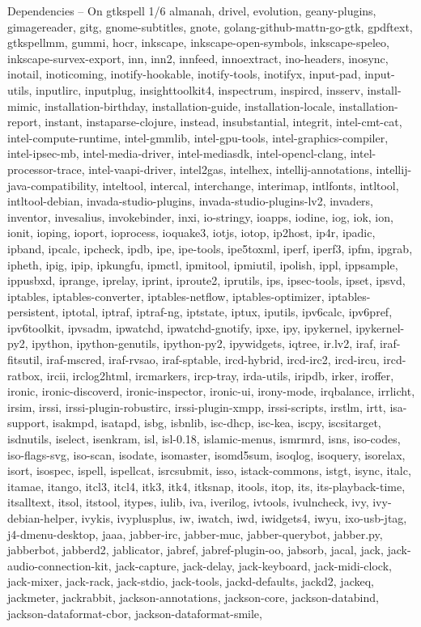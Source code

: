 \documentclass{beamer}
\begin{document}
\begin{frame}{Dependencies – On gtkspell 1/6}
\tiny almanah, drivel, evolution, geany-plugins, gimagereader, gitg, gnome-subtitles, gnote, golang-github-mattn-go-gtk, gpdftext, \alert{gtkspellmm}, gummi, hocr, inkscape, inkscape-open-symbols, inkscape-speleo, inkscape-survex-export, inn, inn2, innfeed, innoextract, ino-headers, inosync, inotail, inoticoming, inotify-hookable, inotify-tools, inotifyx, input-pad, input-utils, inputlirc, inputplug, insighttoolkit4, inspectrum, inspircd, insserv, install-mimic, installation-birthday, installation-guide, installation-locale, installation-report, instant, instaparse-clojure, instead, insubstantial, integrit, intel-cmt-cat, intel-compute-runtime, intel-gmmlib, intel-gpu-tools, intel-graphics-compiler, intel-ipsec-mb, intel-media-driver, intel-mediasdk, intel-opencl-clang, intel-processor-trace, intel-vaapi-driver, intel2gas, intelhex, intellij-annotations, intellij-java-compatibility, inteltool, intercal, interchange, interimap, intlfonts, intltool, intltool-debian, invada-studio-plugins, invada-studio-plugins-lv2, invaders, inventor, invesalius, invokebinder, inxi, io-stringy, ioapps, iodine, iog, iok, ion, ionit, ioping, ioport, ioprocess, ioquake3, iotjs, iotop, ip2host, ip4r, ipadic, ipband, ipcalc, ipcheck, ipdb, ipe, ipe-tools, ipe5toxml, iperf, iperf3, ipfm, ipgrab, ipheth, ipig, ipip, ipkungfu, ipmctl, ipmitool, ipmiutil, ipolish, ippl, ippsample, ippusbxd, iprange, iprelay, iprint, iproute2, iprutils, ips, ipsec-tools, ipset, ipsvd, iptables, iptables-converter, iptables-netflow, iptables-optimizer, iptables-persistent, iptotal, iptraf, iptraf-ng, iptstate, iptux, iputils, ipv6calc, ipv6pref, ipv6toolkit, ipvsadm, ipwatchd, ipwatchd-gnotify, ipxe, ipy, ipykernel, ipykernel-py2, ipython, ipython-genutils, ipython-py2, ipywidgets, iqtree, ir.lv2, iraf, iraf-fitsutil, iraf-mscred, iraf-rvsao, iraf-sptable, ircd-hybrid, ircd-irc2, ircd-ircu, ircd-ratbox, ircii, irclog2html, ircmarkers, ircp-tray, irda-utils, iripdb, irker, iroffer, ironic, ironic-discoverd, ironic-inspector, ironic-ui, irony-mode, irqbalance, irrlicht, irsim, irssi, irssi-plugin-robustirc, irssi-plugin-xmpp, irssi-scripts, irstlm, irtt, isa-support, isakmpd, isatapd, isbg, isbnlib, isc-dhcp, isc-kea, iscpy, iscsitarget, isdnutils, iselect, isenkram, isl, isl-0.18, islamic-menus, ismrmrd, isns, iso-codes, iso-flags-svg, iso-scan, isodate, isomaster, isomd5sum, isoqlog, isoquery, isorelax, isort, isospec, \alert{ispell}, \alert{ispellcat}, isrcsubmit, isso, istack-commons, istgt, isync, italc, itamae, itango, itcl3, itcl4, itk3, itk4, itksnap, itools, itop, its, its-playback-time, itsalltext, itsol, itstool, itypes, iulib, iva, iverilog, ivtools, ivulncheck, ivy, ivy-debian-helper, ivykis, ivyplusplus, iw, iwatch, iwd, iwidgets4, iwyu, ixo-usb-jtag, j4-dmenu-desktop, jaaa, jabber-irc, jabber-muc, jabber-querybot, jabber.py, jabberbot, jabberd2, jablicator, jabref, jabref-plugin-oo, jabsorb, jacal, jack, jack-audio-connection-kit, jack-capture, jack-delay, jack-keyboard, jack-midi-clock, jack-mixer, jack-rack, jack-stdio, jack-tools, jackd-defaults, jackd2, jackeq, jackmeter, jackrabbit, jackson-annotations, jackson-core, jackson-databind, jackson-dataformat-cbor, jackson-dataformat-smile, 
\end{frame}
\end{document}
